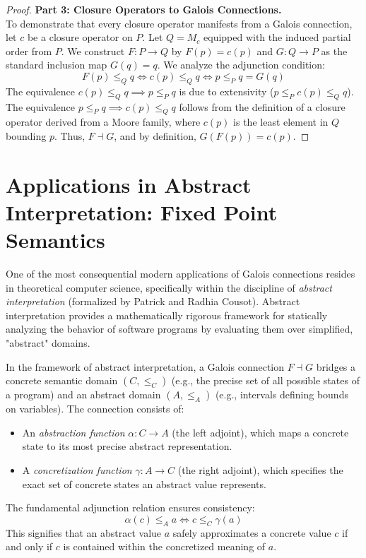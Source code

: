 \begin{proof}
\textbf{Part 3: Closure Operators to Galois Connections.} \\
To demonstrate that every closure operator manifests from a Galois connection, let $c$ be a closure operator on $P$. Let $Q = M_c$ equipped with the induced partial order from $P$. We construct $F: P \to Q$ by $F(p) = c(p)$ and $G: Q \to P$ as the standard inclusion map $G(q) = q$. We analyze the adjunction condition:
\[ F(p) \leq_Q q \iff c(p) \leq_Q q \iff p \leq_P q = G(q) \]
The equivalence $c(p) \leq_Q q \implies p \leq_P q$ is due to extensivity ($p \leq_P c(p) \leq_Q q$). The equivalence $p \leq_P q \implies c(p) \leq_Q q$ follows from the definition of a closure operator derived from a Moore family, where $c(p)$ is the least element in $Q$ bounding $p$. Thus, $F \dashv G$, and by definition, $G(F(p)) = c(p)$.
\end{proof}

\section{Applications in Abstract Interpretation: Fixed Point Semantics}

One of the most consequential modern applications of Galois connections resides in theoretical computer science, specifically within the discipline of \emph{abstract interpretation} (formalized by Patrick and Radhia Cousot). Abstract interpretation provides a mathematically rigorous framework for statically analyzing the behavior of software programs by evaluating them over simplified, "abstract" domains.

\begin{definition}
In the framework of abstract interpretation, a Galois connection $F \dashv G$ bridges a concrete semantic domain $(C, \leq_C)$ (e.g., the precise set of all possible states of a program) and an abstract domain $(A, \leq_A)$ (e.g., intervals defining bounds on variables). The connection consists of:
\begin{itemize}
    \item An \emph{abstraction function} $\alpha: C \to A$ (the left adjoint), which maps a concrete state to its most precise abstract representation.
    \item A \emph{concretization function} $\gamma: A \to C$ (the right adjoint), which specifies the exact set of concrete states an abstract value represents.
\end{itemize}
The fundamental adjunction relation ensures consistency:
\[ \alpha(c) \leq_A a \iff c \leq_C \gamma(a) \]
This signifies that an abstract value $a$ safely approximates a concrete value $c$ if and only if $c$ is contained within the concretized meaning of $a$.
\end{definition}

